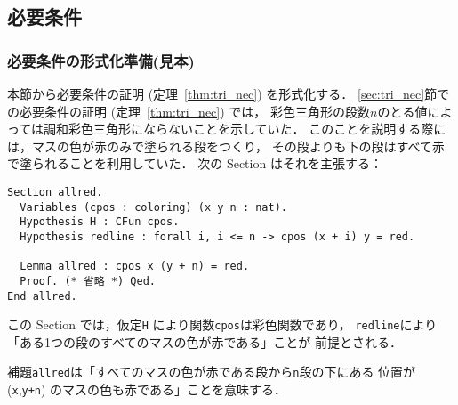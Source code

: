 

\subsection{必要条件}

\newpage

\subsubsection{必要条件の形式化準備(見本)}

本節から必要条件の証明 (定理~\ref{thm:tri_nec}) を形式化する．
\ref{sec:tri_nec}節での必要条件の証明 (定理~\ref{thm:tri_nec}) では，
彩色三角形の段数$n$のとる値によっては調和彩色三角形にならないことを示していた．
このことを説明する際には，マスの色が赤のみで塗られる段をつくり，
その段よりも下の段はすべて赤で塗られることを利用していた．
次の Section はそれを主張する：
\begin{lstlisting}[language=Coq]
Section allred.
  Variables (cpos : coloring) (x y n : nat).
  Hypothesis H : CFun cpos.
  Hypothesis redline : forall i, i <= n -> cpos (x + i) y = red.

  Lemma allred : cpos x (y + n) = red.
  Proof. (* 省略 *) Qed.
End allred.
\end{lstlisting}  

この Section では，仮定{\tt H} により関数{\tt cpos}は彩色関数であり，
{\tt{redline}}により「ある1つの段のすべてのマスの色が赤である」ことが
前提とされる．

補題{\tt allred}は「すべてのマスの色が赤である段から{\tt{n}}段の下にある
  位置が ({\tt{x}},{\tt{y+n}}) のマスの色も赤である」ことを意味する．



